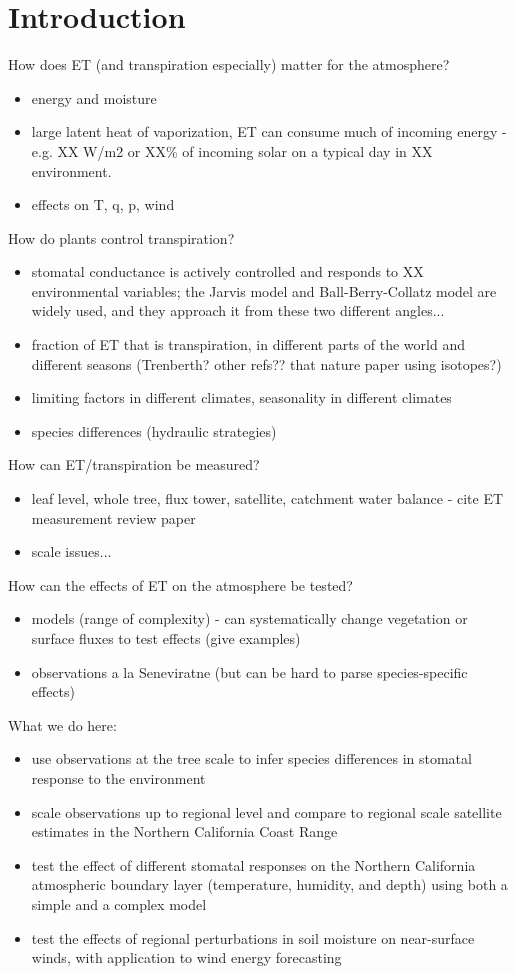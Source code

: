 \chapter{Introduction}
\label{c.intro}

How does ET (and transpiration especially) matter for the atmosphere?
\begin{itemize}
\item energy and moisture
\item large latent heat of vaporization, ET can consume much of incoming energy - e.g. XX W/m2 or XX\% of incoming solar on a typical day in XX environment.
\item effects on T, q, p, wind
\end{itemize}

How do plants control transpiration?
\begin{itemize}
\item stomatal conductance is actively controlled and responds to XX environmental variables; the Jarvis model and Ball-Berry-Collatz model are widely used, and they approach it from these two different angles...
\item fraction of ET that is transpiration, in different parts of the world and different seasons (Trenberth?  other refs?? that nature paper using isotopes?)
\item limiting factors in different climates, seasonality in different climates
\item species differences (hydraulic strategies)
\end{itemize}

How can ET/transpiration be measured?
\begin{itemize}
\item leaf level, whole tree, flux tower, satellite, catchment water balance - cite ET measurement review paper
\item scale issues...
\end{itemize}

How can the effects of ET on the atmosphere be tested?
\begin{itemize}
\item models (range of complexity) - can systematically change vegetation or surface fluxes to test effects (give examples)
\item observations a la Seneviratne (but can be hard to parse species-specific effects)
\end{itemize}

What we do here:
\begin{itemize}
\item use observations at the tree scale to infer species differences in stomatal response to the environment
\item scale observations up to regional level and compare to regional scale satellite estimates in the Northern California Coast Range
\item test the effect of different stomatal responses on the Northern California atmospheric boundary layer (temperature, humidity, and depth) using both a simple and a complex model
\item test the effects of regional perturbations in soil moisture on near-surface winds, with application to wind energy forecasting
\end{itemize}